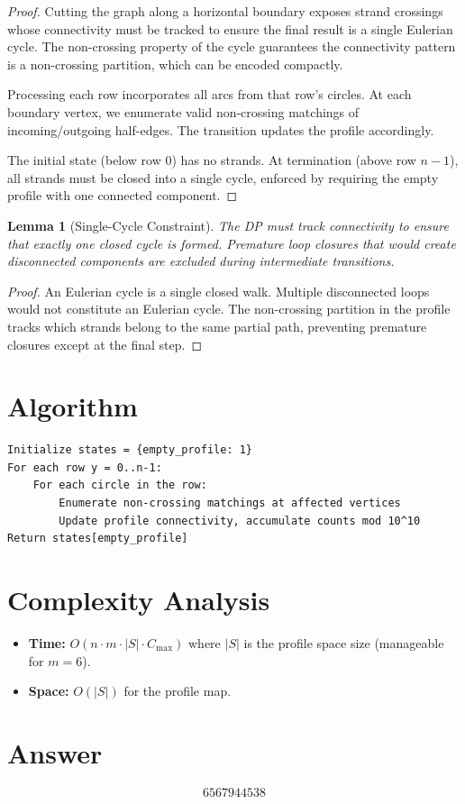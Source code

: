 \documentclass[12pt]{article}
\newtheorem{lemma}[theorem]{Lemma}
\begin{document}
\begin{proof}
Cutting the graph along a horizontal boundary exposes strand crossings whose connectivity must be tracked to ensure the final result is a single Eulerian cycle. The non-crossing property of the cycle guarantees the connectivity pattern is a non-crossing partition, which can be encoded compactly.

Processing each row incorporates all arcs from that row's circles. At each boundary vertex, we enumerate valid non-crossing matchings of incoming/outgoing half-edges. The transition updates the profile accordingly.

The initial state (below row 0) has no strands. At termination (above row $n-1$), all strands must be closed into a single cycle, enforced by requiring the empty profile with one connected component.
\end{proof}

\begin{lemma}[Single-Cycle Constraint]
The DP must track connectivity to ensure that exactly one closed cycle is formed. Premature loop closures that would create disconnected components are excluded during intermediate transitions.
\end{lemma}

\begin{proof}
An Eulerian cycle is a single closed walk. Multiple disconnected loops would not constitute an Eulerian cycle. The non-crossing partition in the profile tracks which strands belong to the same partial path, preventing premature closures except at the final step.
\end{proof}

\section{Algorithm}

\begin{verbatim}
Initialize states = {empty_profile: 1}
For each row y = 0..n-1:
    For each circle in the row:
        Enumerate non-crossing matchings at affected vertices
        Update profile connectivity, accumulate counts mod 10^10
Return states[empty_profile]
\end{verbatim}

\section{Complexity Analysis}

\begin{itemize}
\item \textbf{Time:} $O(n \cdot m \cdot |S| \cdot C_{\max})$ where $|S|$ is the profile space size (manageable for $m=6$).
\item \textbf{Space:} $O(|S|)$ for the profile map.
\end{itemize}

\section{Answer}

\[
\boxed{6567944538}
\]
\end{document}
